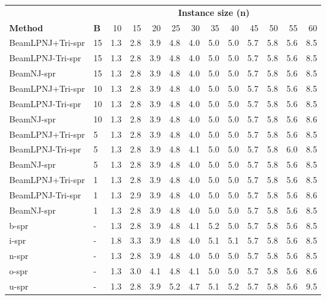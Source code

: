 \begin{tabular}{llrrrrrrrrrrr}
\toprule
&& \multicolumn{11}{c}{\textbf{Instance size (n)}} \\
\cmidrule(lr){3-13}
\textbf{Method} & \textbf{B} & 10 & 15 & 20 & 25 & 30 & 35 & 40 & 45 & 50 & 55 & 60 \\
\midrule
BeamLPNJ+Tri-spr & 15 & 1.3 & 2.8 & 3.9 & 4.8 & 4.0 & 5.0 & 5.0 & 5.7 & 5.8 & 5.6 & 8.5 \\
BeamLPNJ-Tri-spr & 15 & 1.3 & 2.8 & 3.9 & 4.8 & 4.0 & 5.0 & 5.0 & 5.7 & 5.8 & 5.6 & 8.5 \\
BeamNJ-spr & 15 & 1.3 & 2.8 & 3.9 & 4.8 & 4.0 & 5.0 & 5.0 & 5.7 & 5.8 & 5.6 & 8.5 \\
BeamLPNJ+Tri-spr & 10 & 1.3 & 2.8 & 3.9 & 4.8 & 4.0 & 5.0 & 5.0 & 5.7 & 5.8 & 5.6 & 8.5 \\
BeamLPNJ-Tri-spr & 10 & 1.3 & 2.8 & 3.9 & 4.8 & 4.0 & 5.0 & 5.0 & 5.7 & 5.8 & 5.6 & 8.5 \\
BeamNJ-spr & 10 & 1.3 & 2.8 & 3.9 & 4.8 & 4.0 & 5.0 & 5.0 & 5.7 & 5.8 & 5.6 & 8.6 \\
BeamLPNJ+Tri-spr & 5 & 1.3 & 2.8 & 3.9 & 4.8 & 4.0 & 5.0 & 5.0 & 5.7 & 5.8 & 5.6 & 8.5 \\
BeamLPNJ-Tri-spr & 5 & 1.3 & 2.8 & 3.9 & 4.8 & 4.1 & 5.0 & 5.0 & 5.7 & 5.8 & 6.0 & 8.5 \\
BeamNJ-spr & 5 & 1.3 & 2.8 & 3.9 & 4.8 & 4.0 & 5.0 & 5.0 & 5.7 & 5.8 & 5.6 & 8.5 \\
BeamLPNJ+Tri-spr & 1 & 1.3 & 2.8 & 3.9 & 4.8 & 4.0 & 5.0 & 5.0 & 5.7 & 5.8 & 5.6 & 8.5 \\
BeamLPNJ-Tri-spr & 1 & 1.3 & 2.9 & 3.9 & 4.8 & 4.0 & 5.0 & 5.0 & 5.7 & 5.8 & 5.6 & 8.6 \\
BeamNJ-spr & 1 & 1.3 & 2.8 & 3.9 & 4.8 & 4.0 & 5.0 & 5.0 & 5.7 & 5.8 & 5.6 & 8.5 \\
b-spr & - & 1.3 & 2.8 & 3.9 & 4.8 & 4.1 & 5.2 & 5.0 & 5.7 & 5.8 & 5.6 & 8.5 \\
i-spr & - & 1.8 & 3.3 & 3.9 & 4.8 & 4.0 & 5.1 & 5.1 & 5.7 & 5.8 & 5.6 & 8.5 \\
n-spr & - & 1.3 & 2.8 & 3.9 & 4.8 & 4.0 & 5.0 & 5.0 & 5.7 & 5.8 & 5.6 & 8.5 \\
o-spr & - & 1.3 & 3.0 & 4.1 & 4.8 & 4.1 & 5.0 & 5.0 & 5.7 & 5.8 & 5.6 & 8.6 \\
u-spr & - & 1.3 & 2.8 & 3.9 & 5.2 & 4.7 & 5.1 & 5.2 & 5.7 & 5.8 & 5.6 & 9.5 \\
\bottomrule
\end{tabular}

